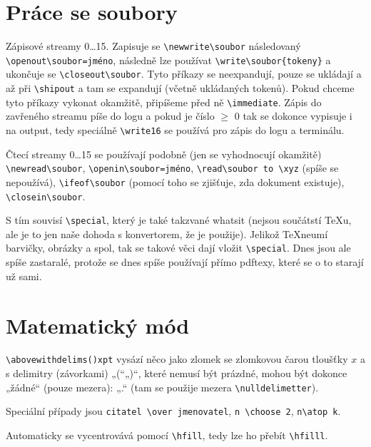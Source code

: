 \documentclass[12pt]{article}					%
\begin{document}
\section{Práce se soubory}
    \begin{definice}[Streamy]
        Zápisové streamy 0…15. Zapisuje se \verb|\newwrite\soubor| následovaný \verb|\openout\soubor=jméno|, následně lze používat \verb|\write\soubor{tokeny}| a ukončuje se \verb|\closeout\soubor|. Tyto příkazy se neexpandují, pouze se ukládají a až při \verb|\shipout| a tam se expandují (včetně ukládaných tokenů). Pokud chceme tyto příkazy vykonat okamžitě, připíšeme před ně \verb|\immediate|. Zápis do zavřeného streamu píše do logu a pokud je číslo $≥$ 0 tak se dokonce vypisuje i na output, tedy speciálně \verb|\write16| se používá pro zápis do logu a terminálu.

        Čtecí streamy 0…15 se používají podobně (jen se vyhodnocují okamžitě) \verb|\newread\soubor|, \verb|\openin\soubor=jméno|, \verb|\read\soubor to \xyz| (spíše se nepoužívá), \verb|\ifeof\soubor| (pomocí toho se zjišťuje, zda dokument existuje), \verb|\closein\soubor|.
    \end{definice}

    \begin{definice}[Special]
        S tím souvisí \verb|\special|, který je také takzvané whatsit (nejsou součátstí TeXu, ale je to jen naše dohoda s konvertorem, že je použije). Jelikož \TeX neumí barvičky, obrázky a spol, tak se takové věci dají vložit \verb|\special|. Dnes jsou ale spíše zastaralé, protože se dnes spíše používají přímo pdftexy, které se o to starají už sami.
    \end{definice}


\section{Matematický mód}
    \begin{definice}[abovewithdelims]
        \verb|\abovewithdelims()xpt| vysází něco jako zlomek se zlomkovou čarou tloušťky $x$ a s delimitry (závorkami) „(“„)“, které nemusí být prázdné, mohou být dokonce „žádné“ (pouze mezera): „.“ (tam se použije mezera \verb|\nulldelimetter|).

        Speciální případy jsou \verb|citatel \over jmenovatel|, \verb|n \choose 2|, \verb|n\atop k|.

        Automaticky se vycentrovává pomocí \verb|\hfill|, tedy lze ho přebít \verb|\hfilll|.
    \end{definice}
\end{document}
